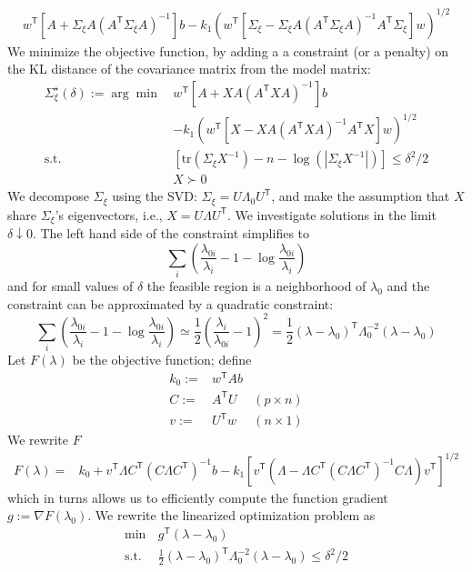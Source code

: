 \documentclass[letter, 12pt]{article}
\newcommand{\transpose}{^\mathsf{T}}
\newcommand{\trace}[1]{{\text{tr}}\left( #1 \right)}
\newcommand{\suchthat}{\text{s.t.}}
\newcommand{\inv}{^{-1}}
\begin{document}
\begin{align*} 
 w\transpose [A + \Sigma_\xi A (A\transpose \Sigma_\xi A)\inv] b - k_1( w\transpose [ \Sigma_\xi - \Sigma_\xi A ( A\transpose \Sigma_\xi A) \inv A\transpose \Sigma_\xi ] w)^{1/2}
\end{align*}
We minimize the objective function, by adding a a constraint (or a penalty) on the KL distance of the covariance matrix from the model matrix:
\begin{align*} 
\Sigma_\xi^\star (\delta) :=\arg\min \, & w\transpose [A + X A (A\transpose X  A)\inv] b \\
&- k_1( w\transpose [ X  - X  A ( A\transpose X  A) \inv A\transpose X  ] w)^{1/2} \\
\suchthat &[\trace{\Sigma_\xi X\inv} -n -\log( |\Sigma_\xi X\inv|)]\le \delta^2/2 \\
  & X \succ 0
\end{align*}
We decompose $\Sigma_\xi$ using the SVD: $\Sigma_\xi=U\Lambda_0 U\transpose$, and make the assumption that $X$ share $\Sigma_\xi$'s eigenvectors, i.e.,  $X=U\Lambda U\transpose $.
We investigate solutions in the limit $\delta \downarrow 0$. The left hand side of the constraint simplifies to
\[
\sum_i \left(
	\frac{\lambda_{0i}}{\lambda_{i}} -1 -\log \frac{\lambda_{0i}}{\lambda_{i}} 
\right)  
\]
and for small values of $\delta$ the feasible region is a neighborhood of $\lambda_0$ and the constraint can be approximated by a quadratic constraint:
\[
\sum_i \left(
	\frac{\lambda_{0i}}{\lambda_{i}} -1 -\log \frac{\lambda_{0i}}{\lambda_{i}} 
\right) \simeq \frac{1}{2} \left(  \frac{\lambda_{i}}{\lambda_{0i}}-1 \right)^2=\frac{1}{2}(\lambda-\lambda_0)\transpose \Lambda_0^{-2}(\lambda-\lambda_0)
\]
Let $F(\lambda)$ be the objective function; define 
\begin{align*}
k_0:= &w\transpose A b & \\
C:=&A \transpose U & (p\times n)\\ 
v:=&U\transpose w & (n\times 1)
\end{align*}
 We rewrite $F$
\begin{align*}
	F(\lambda) =& k_0+ v\transpose\Lambda C\transpose (C\Lambda C\transpose)\inv  b- k_1\left[v\transpose \left(\Lambda - \Lambda C\transpose (C\Lambda C\transpose)\inv C\Lambda \right) v\transpose \right]^{1/2}
\end{align*}
which in turns allows us to efficiently compute the function gradient $g:=\nabla F(\lambda_0)$.
We rewrite the linearized optimization problem as
\begin{align*}
\min\, & g\transpose(\lambda-\lambda_0)\\
	\suchthat\, & \frac{1}{2}(\lambda-\lambda_0)\transpose \Lambda_0^{-2}(\lambda-\lambda_0) \le \delta^2/2 
\end{align*}
\end{document}
